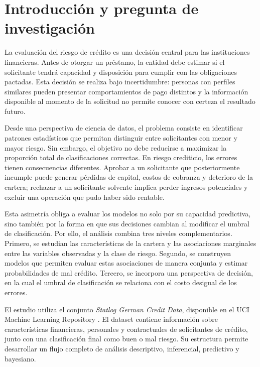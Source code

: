 \section{Introducción y pregunta de investigación}
\label{sec:introduccion}

La evaluación del riesgo de crédito es una decisión central para las
instituciones financieras. Antes de otorgar un préstamo, la entidad debe
estimar si el solicitante tendrá capacidad y disposición para cumplir con
las obligaciones pactadas. Esta decisión se realiza bajo incertidumbre:
personas con perfiles similares pueden presentar comportamientos de pago
distintos y la información disponible al momento de la solicitud no
permite conocer con certeza el resultado futuro.

Desde una perspectiva de ciencia de datos, el problema consiste en
identificar patrones estadísticos que permitan distinguir entre
solicitantes con menor y mayor riesgo. Sin embargo, el objetivo no debe
reducirse a maximizar la proporción total de clasificaciones correctas.
En riesgo crediticio, los errores tienen consecuencias diferentes. Aprobar
a un solicitante que posteriormente incumple puede generar pérdidas de
capital, costos de cobranza y deterioro de la cartera; rechazar a un
solicitante solvente implica perder ingresos potenciales y excluir una
operación que pudo haber sido rentable.

Esta asimetría obliga a evaluar los modelos no solo por su capacidad
predictiva, sino también por la forma en que sus decisiones cambian al
modificar el umbral de clasificación. Por ello, el análisis combina tres
niveles complementarios. Primero, se estudian las características de la
cartera y las asociaciones marginales entre las variables observadas y la
clase de riesgo. Segundo, se construyen modelos que permiten evaluar estas
asociaciones de manera conjunta y estimar probabilidades de mal crédito.
Tercero, se incorpora una perspectiva de decisión, en la cual el umbral
de clasificación se relaciona con el costo desigual de los errores.

El estudio utiliza el conjunto \textit{Statlog German Credit Data},
disponible en el UCI Machine Learning Repository
\parencite{hofmann1994statlog}. El dataset contiene información sobre
características financieras, personales y contractuales de solicitantes
de crédito, junto con una clasificación final como buen o mal riesgo.
Su estructura permite desarrollar un flujo completo de análisis
descriptivo, inferencial, predictivo y bayesiano.


